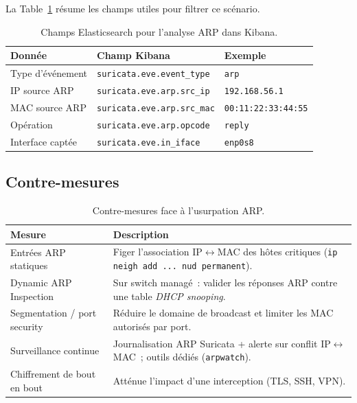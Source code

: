\documentclass[12pt]{article}
\begin{document}
La Table~\ref{tab:arp_fields} résume les champs utiles pour filtrer ce scénario.

\begin{table}[htbp]
  \centering
  \begin{tabular}{@{}lll@{}}
    \toprule
    \textbf{Donnée} & \textbf{Champ Kibana} & \textbf{Exemple} \\
    \midrule
    Type d'événement   & \texttt{suricata.eve.event\_type} & \texttt{arp} \\
    IP source ARP      & \texttt{suricata.eve.arp.src\_ip}  & \texttt{192.168.56.1} \\
    MAC source ARP     & \texttt{suricata.eve.arp.src\_mac} & \texttt{00:11:22:33:44:55} \\
    Opération          & \texttt{suricata.eve.arp.opcode}   & \texttt{reply} \\
    Interface captée   & \texttt{suricata.eve.in\_iface}    & \texttt{enp0s8} \\
    \bottomrule
  \end{tabular}
  \caption{Champs Elasticsearch pour l'analyse ARP dans Kibana.}
  \label{tab:arp_fields}
\end{table}


\subsection{Contre-mesures}

\begin{table}[htbp]
  \centering
  \begin{tabular}{@{}p{3.2cm}p{9.5cm}@{}}
    \toprule
    \textbf{Mesure} & \textbf{Description} \\
    \midrule
    Entrées ARP statiques &
    Figer l'association IP$\leftrightarrow$MAC des hôtes critiques
    (\texttt{ip neigh add ... nud permanent}). \\
    Dynamic ARP Inspection &
    Sur switch managé~: valider les réponses ARP contre une table
    \textit{DHCP snooping}. \\
    Segmentation / port security &
    Réduire le domaine de broadcast et limiter les MAC autorisés par port. \\
    Surveillance continue &
    Journalisation ARP Suricata + alerte sur conflit IP$\leftrightarrow$MAC~;
    outils dédiés (\texttt{arpwatch}). \\
    Chiffrement de bout en bout &
    Atténue l'impact d'une interception (TLS, SSH, VPN). \\
    \bottomrule
  \end{tabular}
  \caption{Contre-mesures face à l'usurpation ARP.}
  \label{tab:arp_mitigation}
\end{table}
\end{document}
